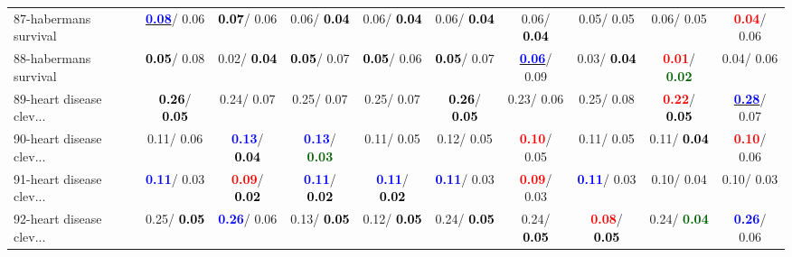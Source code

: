 \begin{table}[h]
\begin{center}
{\begin{tabular}{lc|c|c|c|c|c|c|c|c}
87-habermans survival & \underline{\textcolor{blue}{\textbf{  0.08}}}/  0.06 & \textcolor{black}{\textbf{  0.07}}/  0.06 &   0.06/\textcolor{black}{\textbf{  0.04}} &   0.06/\textcolor{black}{\textbf{  0.04}} &   0.06/\textcolor{black}{\textbf{  0.04}} &   0.06/\textcolor{black}{\textbf{  0.04}} &   0.05/  0.05 &   0.06/  0.05 & \textcolor{red}{\textbf{  0.04}}/  0.06 \\
88-habermans survival & \textcolor{black}{\textbf{  0.05}}/  0.08 &   0.02/\textcolor{black}{\textbf{  0.04}} & \textcolor{black}{\textbf{  0.05}}/  0.07 & \textcolor{black}{\textbf{  0.05}}/  0.06 & \textcolor{black}{\textbf{  0.05}}/  0.07 & \underline{\textcolor{blue}{\textbf{  0.06}}}/  0.09 &   0.03/\textcolor{black}{\textbf{  0.04}} & \textcolor{red}{\textbf{  0.01}}/\textcolor{darkgreen}{\textbf{  0.02}} &   0.04/  0.06 \\
89-heart disease clev... & \textcolor{black}{\textbf{  0.26}}/\textcolor{black}{\textbf{  0.05}} &   0.24/  0.07 &   0.25/  0.07 &   0.25/  0.07 & \textcolor{black}{\textbf{  0.26}}/\textcolor{black}{\textbf{  0.05}} &   0.23/  0.06 &   0.25/  0.08 & \textcolor{red}{\textbf{  0.22}}/\textcolor{black}{\textbf{  0.05}} & \underline{\textcolor{blue}{\textbf{  0.28}}}/  0.07 \\
90-heart disease clev... &   0.11/  0.06 & \textcolor{blue}{\textbf{  0.13}}/\textcolor{black}{\textbf{  0.04}} & \textcolor{blue}{\textbf{  0.13}}/\textcolor{darkgreen}{\textbf{  0.03}} &   0.11/  0.05 &   0.12/  0.05 & \textcolor{red}{\textbf{  0.10}}/  0.05 &   0.11/  0.05 &   0.11/\textcolor{black}{\textbf{  0.04}} & \textcolor{red}{\textbf{  0.10}}/  0.06 \\
91-heart disease clev... & \textcolor{blue}{\textbf{  0.11}}/  0.03 & \textcolor{red}{\textbf{  0.09}}/\textcolor{black}{\textbf{  0.02}} & \textcolor{blue}{\textbf{  0.11}}/\textcolor{black}{\textbf{  0.02}} & \textcolor{blue}{\textbf{  0.11}}/\textcolor{black}{\textbf{  0.02}} & \textcolor{blue}{\textbf{  0.11}}/  0.03 & \textcolor{red}{\textbf{  0.09}}/  0.03 & \textcolor{blue}{\textbf{  0.11}}/  0.03 &   0.10/  0.04 &   0.10/  0.03 \\
92-heart disease clev... &   0.25/\textcolor{black}{\textbf{  0.05}} & \textcolor{blue}{\textbf{  0.26}}/  0.06 &   0.13/\textcolor{black}{\textbf{  0.05}} &   0.12/\textcolor{black}{\textbf{  0.05}} &   0.24/\textcolor{black}{\textbf{  0.05}} &   0.24/\textcolor{black}{\textbf{  0.05}} & \textcolor{red}{\textbf{  0.08}}/\textcolor{black}{\textbf{  0.05}} &   0.24/\textcolor{darkgreen}{\textbf{  0.04}} & \textcolor{blue}{\textbf{  0.26}}/  0.06 \\ \hline

\end{tabular}}
\end{center}
\end{table}
